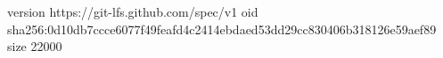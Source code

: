 version https://git-lfs.github.com/spec/v1
oid sha256:0d10db7ccce6077f49feafd4c2414ebdaed53dd29cc830406b318126e59aef89
size 22000
